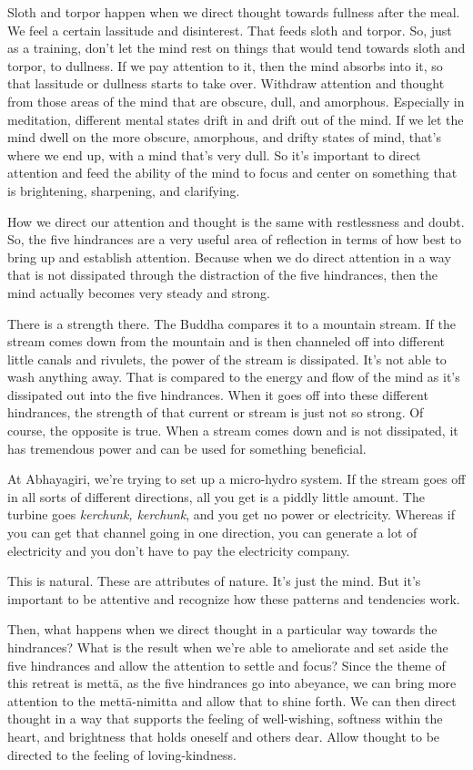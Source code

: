 Sloth and torpor happen when we direct thought towards fullness after
the meal. We feel a certain lassitude and disinterest. That feeds sloth
and torpor. So, just as a training, don’t let the mind rest on things
that would tend towards sloth and torpor, to dullness. If we pay
attention to it, then the mind absorbs into it, so that lassitude or
dullness starts to take over. Withdraw attention and thought from those
areas of the mind that are obscure, dull, and amorphous. Especially in
meditation, different mental states drift in and drift out of the mind.
If we let the mind dwell on the more obscure, amorphous, and drifty
states of mind, that’s where we end up, with a mind that’s very dull. So
it’s important to direct attention and feed the ability of the mind to
focus and center on something that is brightening, sharpening, and
clarifying.

How we direct our attention and thought is the same with restlessness
and doubt. So, the five hindrances are a very useful area of reflection
in terms of how best to bring up and establish attention. Because when
we do direct attention in a way that is not dissipated through the
distraction of the five hindrances, then the mind actually becomes very
steady and strong.

There is a strength there. The Buddha compares it to a mountain stream.
If the stream comes down from the mountain and is then channeled off
into different little canals and rivulets, the power of the stream is
dissipated. It’s not able to wash anything away. That is compared to the
energy and flow of the mind as it’s dissipated out into the five
hindrances. When it goes off into these different hindrances, the
strength of that current or stream is just not so strong. Of course, the
opposite is true. When a stream comes down and is not dissipated, it has
tremendous power and can be used for something beneficial.

At Abhayagiri, we’re trying to set up a micro-hydro system. If the
stream goes off in all sorts of different directions, all you get is a
piddly little amount. The turbine goes \emph{kerchunk, kerchunk}, and
you get no power or electricity. Whereas if you can get that channel
going in one direction, you can generate a lot of electricity and you
don’t have to pay the electricity company.

This is natural. These are attributes of nature. It’s just the mind. But
it’s important to be attentive and recognize how these patterns and
tendencies work.

Then, what happens when we direct thought in a particular way towards
the hindrances? What is the result when we’re able to ameliorate and set
aside the five hindrances and allow the attention to settle and focus?
Since the theme of this retreat is mettā, as the five hindrances go into
abeyance, we can bring more attention to the mettā-nimitta and allow
that to shine forth. We can then direct thought in a way that supports
the feeling of well-wishing, softness within the heart, and brightness
that holds oneself and others dear. Allow thought to be directed to the
feeling of loving-kindness.

